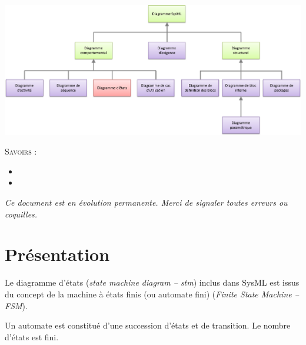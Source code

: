 \documentclass[10pt]{article}
\begin{document}





\begin{center}
\includegraphics[width=.95\textwidth]{images/stm} 
\end{center}

\vspace{.2cm}

%

\begin{savoir}
\textsc{Savoirs :}
\begin{itemize}
\item %
\item %
\end{itemize}
\end{savoir}

\setlength{\parskip}{0ex plus 0.2ex minus 0ex}
 \renewcommand{\contentsname}{}
 \renewcommand{\baselinestretch}{1}

\tableofcontents

 \renewcommand{\baselinestretch}{1.2}
\setlength{\parskip}{2ex plus 0.5ex minus 0.2ex}

\textit{Ce document est en évolution permanente. Merci de signaler toutes
erreurs ou coquilles.}

\section{Présentation}
\begin{rem}
Le diagramme d'états (\textit{state machine diagram -- stm}) inclus dans SysML est issus du concept de la machine à états finis (ou automate fini) (\textit{Finite State Machine -- FSM}). 

Un automate est constitué d'une succession d'états et de transition. Le nombre d'états est fini. 
\end{rem}
\end{document}

